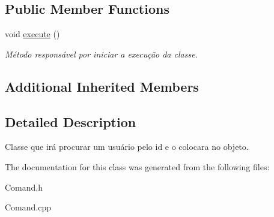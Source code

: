 \subsection*{Public Member Functions}
\begin{DoxyCompactItemize}
\item 
\hypertarget{class_command_find_user_a5ec31dbc1a789b3df354bf05f8cca046}{void \hyperlink{class_command_find_user_a5ec31dbc1a789b3df354bf05f8cca046}{execute} ()}\label{class_command_find_user_a5ec31dbc1a789b3df354bf05f8cca046}

\begin{DoxyCompactList}\small\item\em Método responsável por iniciar a execução da classe. \end{DoxyCompactList}\end{DoxyCompactItemize}
\subsection*{Additional Inherited Members}


\subsection{Detailed Description}
Classe que irá procurar um usuário pelo id e o colocara no objeto. 

The documentation for this class was generated from the following files\-:\begin{DoxyCompactItemize}
\item 
Comand.\-h\item 
Comand.\-cpp\end{DoxyCompactItemize}
